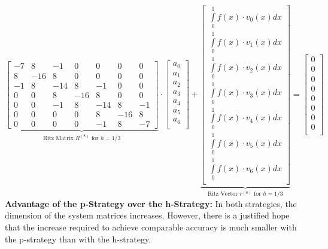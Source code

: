 $\underset{\text{Ritz Matrix $R^{(8)}$ for } h=1/3}{\underbrace{\begin{bmatrix}
	-7& 8 & -1& 0& 0& 0& 0\\
	 8& -16& 8& 0& 0& 0& 0\\
	-1& 8& -14& 8& -1& 0& 0\\
	 0& 0& 8& -16& 8& 0& 0\\
	 0& 0& -1& 8& -14& 8& -1\\
	 0& 0& 0& 0& 8& -16& 8\\
	 0& 0& 0& 0& -1& 8& -7
\end{bmatrix}}}\cdot\begin{bmatrix}
	a_0\\
	a_1\\
	a_2\\
	a_3\\
	a_4\\
	a_5\\
	a_6\\
\end{bmatrix}
+\underset{\text{Ritz Vector $r^{(8)}$ for } h=1/3}{\underbrace{\begin{bmatrix}
	\int\limits_{0}^{1}{f(x)\cdot v_0(x)dx}\\
	\int\limits_{0}^{1}{f(x)\cdot v_1(x)dx}\\
	\int\limits_{0}^{1}{f(x)\cdot v_2(x)dx}\\
	\int\limits_{0}^{1}{f(x)\cdot v_3(x)dx}\\
	\int\limits_{0}^{1}{f(x)\cdot v_4(x)dx}\\
	\int\limits_{0}^{1}{f(x)\cdot v_5(x)dx}\\
	\int\limits_{0}^{1}{f(x)\cdot v_6(x)dx}\\
\end{bmatrix}}}=
\begin{bmatrix}
	0\\
	0\\
	0\\
	0\\
	0\\
	0\\
	0\\
	0\\
\end{bmatrix}
$\\

\textbf{Advantage of the p-Strategy over the h-Strategy:}
In both strategies, the dimension of the system matrices increases.
However, there is a justified hope that the increase required to achieve comparable accuracy
is much smaller with the p-strategy than with the h-strategy.

